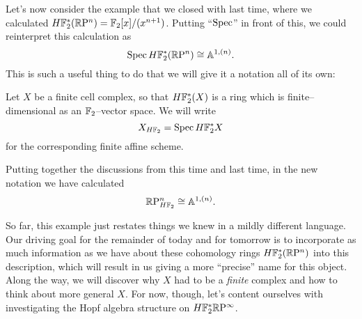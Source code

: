 

Let's now consider the example that we closed with last time, where we calculated $H\mathbb F_2^*(\mathbb R\mathrm P^n) = \mathbb F_2[x] / (x^{n+1})$.  Putting ``$\operatorname{Spec}$'' in front of this, we could reinterpret this calculation as \[\operatorname{Spec} H\mathbb F_2^*(\mathbb R\mathrm P^n) \cong \mathbb A^{1, (n)}.\]  This is such a useful thing to do that we will give it a notation all of its own:

\begin{definition}
Let $X$ be a finite cell complex, so that $H\mathbb F_2^*(X)$ is a ring which is finite--dimensional as an $\mathbb F_2$--vector space.  We will write \[X_{H\mathbb F_2} = \operatorname{Spec} H\mathbb F_2^* X\] for the corresponding finite affine scheme.
\end{definition}

\begin{example}
Putting together the discussions from this time and last time, in the new notation we have calculated \[\mathbb R\mathrm P^n_{H\mathbb F_2} \cong \mathbb A^{1, (n)}.\]
\end{example}

So far, this example just restates things we knew in a mildly different language.  Our driving goal for the remainder of today and for tomorrow is to incorporate as much information as we have about these cohomology rings $H\mathbb F_2^* (\mathbb R\mathrm P^n)$ into this description, which will result in us giving a more ``precise'' name for this object.  Along the way, we will discover why $X$ had to be a \emph{finite} complex and how to think about more general $X$.  For now, though, let's content ourselves with investigating the Hopf algebra structure on $H\mathbb F_2^* \mathbb R\mathrm P^\infty$.

